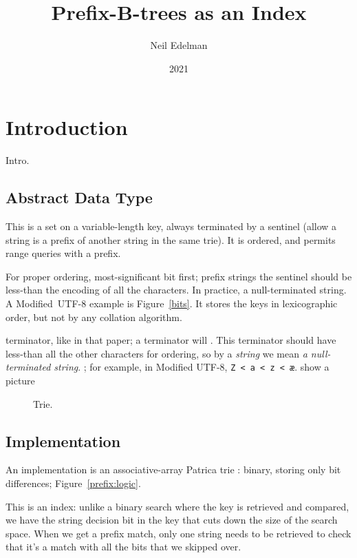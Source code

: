 \documentclass[12pt]{article}
\author{Neil Edelman}
\title{Prefix-B-trees as an Index}
\date{2021}
\newcommand{\code}[1]{\colorbox{light-gray}{\texttt{#1}}}
\begin{document}
\maketitle


\section{Introduction}

\noindent
Intro.\cite{morrison1968patricia}\cite{fredkin1960trie}\cite{knuth1997sorting}

\subsection{Abstract Data Type}

This is a set on a variable-length key, always terminated by a sentinel (allow a string is a prefix of another string in the same trie). It is ordered, and permits range queries with a prefix.

For proper ordering, most-significant bit first; prefix strings the sentinel should be less-than the encoding of all the characters. In practice, a null-terminated string. A Modified~UTF-8 example is Figure~\ref{bits}. It stores the keys in lexicographic order, but not by any collation algorithm.

terminator, like in that paper; a terminator will . This terminator should have less-than all the other characters for ordering, so by a \emph{string} we mean \emph{a null-terminated string}. ; for example, in Modified UTF-8, \code{Z < a < z < æ}. show a picture

\begin{figure} %
	\centering
	\caption{Trie.\label{trie}}
\end{figure}

\subsection{Implementation}

An implementation is an associative-array Patrica trie \cite{}: binary, storing only bit differences; Figure~\ref{prefix:logic}.

This is an index: unlike a binary search where the key is retrieved and compared, we have the string decision bit in the key that cuts down the size of the search space. When we get a prefix match, only one string needs to be retrieved to check that it's a match with all the bits that we skipped over.
\end{document}

